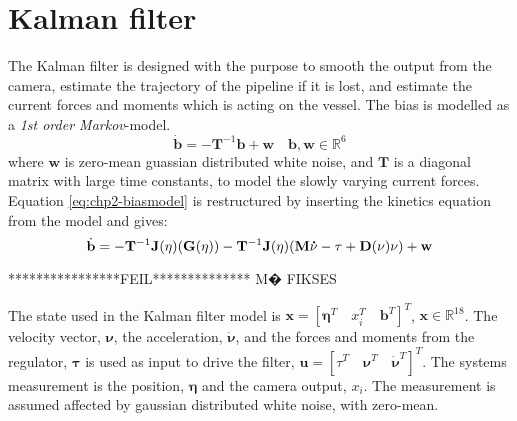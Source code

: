\section{Kalman filter}
	The Kalman filter is designed with the purpose to smooth the output from the camera, estimate the trajectory 
	of the pipeline if it is lost, and estimate the current forces and moments which is acting on the vessel. 
	The bias is modelled as a \textit{1st order Markov}-model.
	\begin{equation}
		\label{eq:chp2-biasmodel}
		\dot{\mathbf{b}} = -\mathbf{T}^{-1} \mathbf{b} + \mathbf{w} \quad \mathbf{b}, \mathbf{w} \in \mathbb{R}^6
	\end{equation}
	where $\mathbf{w}$ is zero-mean guassian distributed white noise, and $\mathbf{T}$ is a diagonal matrix with 
	large time constants, to model the slowly varying current forces. 
	Equation \eqref{eq:chp2-biasmodel} is restructured by inserting the kinetics equation from the model and gives:
	\begin{equation}
		\dot{\mathbf{b}} = -\mathbf{T}^{-1} \mathbf{J}(\mathbf{\eta}) (\mathbf{G}(\mathbf{\eta})) - \mathbf{T}^{-1} 
		\mathbf{J}(\mathbf{\eta}) (\mathbf{M}\mathbf{\dot{\nu}} - \tau + \mathbf{D}(\mathbf{\nu})\mathbf{\nu}) + \mathbf{w}
	\end{equation}

	****************FEIL************** M� FIKSES

	The state used in the Kalman filter model is $\mathbf{x} = [\mathbf{\eta}^T \quad x_i^T 
	\quad \mathbf{b}^T]^T$, $\mathbf{x} \in \mathbb{R}^{18}$. The velocity vector, $\mathbf{\nu}$, 
	the acceleration, $\dot{\mathbf{\nu}}$, and the forces and moments from the regulator, $\mathbf{\tau}$ is 
	used as input to drive the filter, $\mathbf{u} = [\tau^T \quad \mathbf{\nu}^T \quad \mathbf{\dot{\nu}}^T]^T$. 
	The systems measurement is the position, $\mathbf{\eta}$ and the camera output, $x_i$. The measurement is 
	assumed affected by gaussian distributed white noise, with zero-mean.
	

